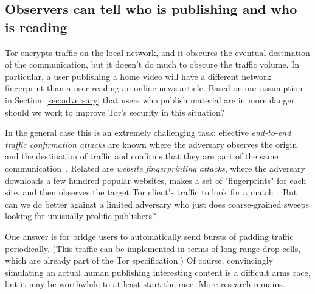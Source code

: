 \documentclass{llncs}
\begin{document}



\subsection{Observers can tell who is publishing and who is reading}
\label{subsec:upload-padding}

Tor encrypts traffic on the local network, and it obscures the eventual
destination of the communication, but it doesn't do much to obscure the
traffic volume. In particular, a user publishing a home video will have a
different network fingerprint than a user reading an online news article.
Based on our assumption in Section~\ref{sec:adversary} that users who
publish material are in more danger, should we work to improve Tor's
security in this situation?

In the general case this is an extremely challenging task:
effective \emph{end-to-end traffic confirmation attacks}
are known where the adversary observes the origin and the
destination of traffic and confirms that they are part of the
same communication~\cite{danezis:pet2004,e2e-traffic}. Related are
\emph{website fingerprinting attacks}, where the adversary downloads
a few hundred popular websites, makes a set of "fingerprints" for each
site, and then observes the target Tor client's traffic to look for
a match~\cite{pet05-bissias,defensive-dropping}. But can we do better
against a limited adversary who just does coarse-grained sweeps looking
for unusually prolific publishers?

One answer is for bridge users to automatically send bursts of padding
traffic periodically. (This traffic can be implemented in terms of
long-range drop cells, which are already part of the Tor specification.)
Of course, convincingly simulating an actual human publishing interesting
content is a difficult arms race, but it may be worthwhile to at least
start the race. More research remains.
\end{document}
